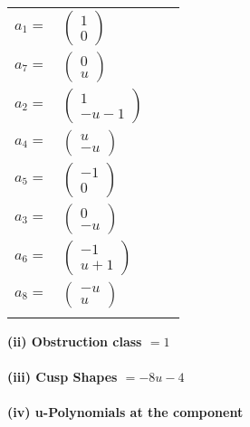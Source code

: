 \documentclass[1p]{elsarticle_modified}
\theoremstyle{definition}
\begin{document}
\begin{tabular}{m{7pt} m{180pt} m{7pt} m{180pt} }
\flushright $a_{1}=$&$\begin{pmatrix}1\\0\end{pmatrix}$ \\
\flushright $a_{7}=$&$\begin{pmatrix}0\\u\end{pmatrix}$ \\
\flushright $a_{2}=$&$\begin{pmatrix}1\\- u-1\end{pmatrix}$ \\
\flushright $a_{4}=$&$\begin{pmatrix}u\\- u\end{pmatrix}$ \\
\flushright $a_{5}=$&$\begin{pmatrix}-1\\0\end{pmatrix}$ \\
\flushright $a_{3}=$&$\begin{pmatrix}0\\- u\end{pmatrix}$ \\
\flushright $a_{6}=$&$\begin{pmatrix}-1\\u+1\end{pmatrix}$ \\
\flushright $a_{8}=$&$\begin{pmatrix}- u\\u\end{pmatrix}$\\&\end{tabular}
\flushleft \textbf{(ii) Obstruction class $= 1$}\\~\\
\flushleft \textbf{(iii) Cusp Shapes $= -8 u-4$}\\~\\
\newpage\renewcommand{\arraystretch}{1}
\flushleft \textbf{(iv) u-Polynomials at the component}\newline \\
\end{document}

